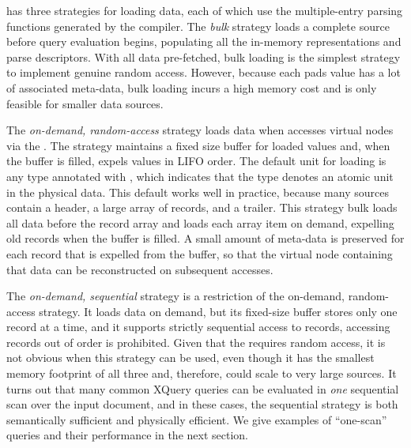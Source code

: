 \padx{} has three strategies for loading data, each of which use the
multiple-entry parsing functions generated by the \pads{} compiler.
The \emph{bulk} strategy loads a complete \pads{} source before query
evaluation begins, populating all the in-memory representations and
parse descriptors.  With all data pre-fetched, bulk loading is the
simplest strategy to implement genuine random access.  However,
because each pads value has a lot of associated meta-data, bulk
loading incurs a high memory cost and is only feasible for smaller
data sources.

The \emph{on-demand, random-access} strategy loads \pads{} data when
\Galax{} accesses virtual nodes via the \absdm{}.  The strategy
maintains a fixed size buffer for loaded values and, when the buffer is
filled, expels values in LIFO order.  The default unit for loading is
any \pads{} type annotated with , which indicates that the
type denotes an atomic unit in the physical data.  This default works
well in practice, because many \pads{} sources contain a header, a
large {array} of records, and a trailer.  This strategy bulk loads all
data before the record array and loads each array item on demand,
expelling old records when the buffer is filled.  A small amount of
meta-data is preserved for each record that is expelled from the
buffer, so that the virtual node containing that data can be
reconstructed on subsequent accesses.

The \emph{on-demand, sequential} strategy is a restriction of the
on-demand, random-access strategy.  It loads data on demand, but its
fixed-size buffer stores only one record at a time, and it supports
strictly sequential access to records, \ie{} accessing records out of
order is prohibited.  Given that the \Galax{} \absdm{} requires random
access, it is not obvious when this strategy can be used, even though
it has the smallest memory footprint of all three and, therefore,
could scale to very large sources.  It turns out that many common
XQuery queries can be evaluated in \emph{one} sequential scan over the
input document, and in these cases, the sequential strategy is both
semantically sufficient and physically efficient.  We give examples of
``one-scan'' queries and their performance in the next section.


